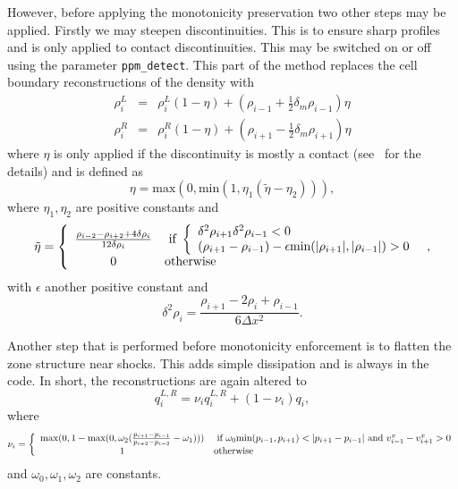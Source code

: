 \documentclass{article}
\begin{document}
However, before applying the monotonicity preservation two other steps
may be applied. Firstly we may steepen discontinuities. This is to
ensure sharp profiles and is only applied to contact
discontinuities. This may be switched on or off using the parameter
{\tt ppm\_detect}. This part of the method replaces the cell boundary
reconstructions of the density with
\begin{eqnarray}
  \label{eq:ppmdetect}
  \rho_i^L & = & \rho_i^L (1-\eta) + \left(\rho_{i-1} + \frac{1}{2}
    \delta_m \rho_{i-1} \right) \eta \\
  \rho_i^R & = & \rho_i^R (1-\eta) + \left(\rho_{i+1} - \frac{1}{2}
    \delta_m \rho_{i+1} \right) \eta
\end{eqnarray}
where $\eta$ is only applied if the discontinuity is mostly a contact
(see~\cite{ppm} for the details) and is defined as
\begin{equation}
  \label{eq:ppmeta}
  \eta = \text{max}(0, \text{min}(1, \eta_1 (\tilde{\eta} - \eta_2))),
\end{equation}
where $\eta_1,\eta_2$ are positive constants and
\begin{equation}
  \label{eq:ppmetatilde}
  \tilde{\eta} = \left\{ \begin{array}{c l} 
  \frac{\rho_{i-2} - \rho_{i+2} + 4 \delta\rho_i}{12\delta\rho_i} &
  \text{ if } \left\{
\begin{array}{l}
  \delta^2\rho_{i+1}\delta^2\rho_{i-1} < 0\\
  (\rho_{i+1} - \rho_{i-1}) - \epsilon \text{min}(|\rho_{i+1}|,|\rho_{i-1}|) >
  0\nonumber
\end{array} \right. \\
  0 & \text{otherwise} \end{array} \right.,
\end{equation}
with $\epsilon$ another positive constant and
\begin{equation}
  \label{eq:ppmd2rho}
  \delta^2\rho_i = \frac{\rho_{i+1} - 2\rho_i + \rho_{i-1}}{6\Delta
    x^2}.  
\end{equation}

Another step that is performed before monotonicity enforcement is to
flatten the zone structure near shocks. This adds simple dissipation
and is always in the code. In short, the reconstructions are again
altered to
\begin{equation}
  \label{eq:ppmflatten}
  q_i^{L,R} = \nu_i q_i^{L,R} + (1 - \nu_i) q_i,
\end{equation}
where
\begin{equation}
  \label{eq:ppmflatten2}
  \nu_i = \left\{ \begin{array}{c l} {\rm max}(0, 1 - \text{max}(0, \omega_2
      (\frac{p_{i+1} - p_{i-1}}{p_{i+2} - p_{i-2}} - \omega_1))) & \text{
        if } \omega_0 \text{min}(p_{i-1}, p_{i+1}) < |p_{i+1} - p_{i - 1}|
      \text{ and } v^x_{i-1} - v^x_{i+1} > 0 \\
      1 & \text{otherwise} \end{array} \right.
\end{equation}
and $\omega_0, \omega_1,\omega_2$ are constants.
\end{document}
